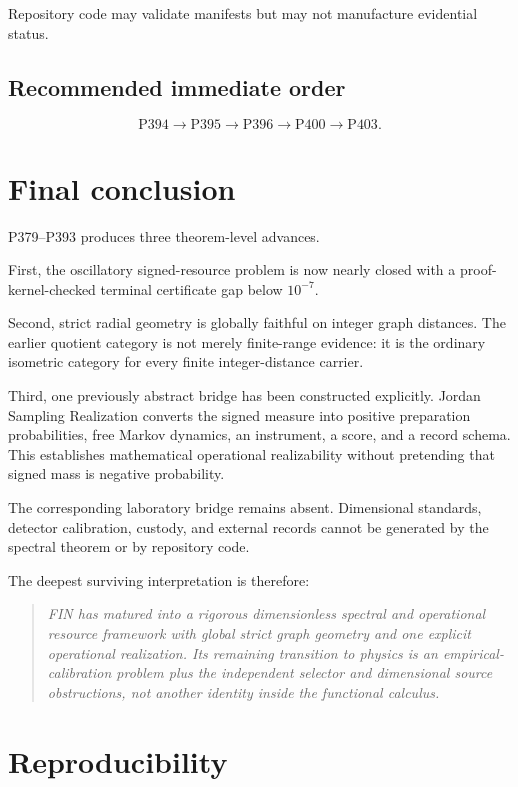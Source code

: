\documentclass[11pt,a4paper,openany]{report}
\begin{document}
Repository code may validate manifests but may not manufacture evidential status.

\section{Recommended immediate order}

\[
\boxed{
\mathrm{P394}
\longrightarrow
\mathrm{P395}
\longrightarrow
\mathrm{P396}
\longrightarrow
\mathrm{P400}
\longrightarrow
\mathrm{P403}
}.
\]

\chapter{Final conclusion}

P379--P393 produces three theorem-level advances.

First, the oscillatory signed-resource problem is now nearly closed with a proof-kernel-checked terminal certificate gap below \(10^{-7}\).

Second, strict radial geometry is globally faithful on integer graph distances. The earlier quotient category is not merely finite-range evidence: it is the ordinary isometric category for every finite integer-distance carrier.

Third, one previously abstract bridge has been constructed explicitly. Jordan Sampling Realization converts the signed measure into positive preparation probabilities, free Markov dynamics, an instrument, a score, and a record schema. This establishes mathematical operational realizability without pretending that signed mass is negative probability.

The corresponding laboratory bridge remains absent. Dimensional standards, detector calibration, custody, and external records cannot be generated by the spectral theorem or by repository code.

The deepest surviving interpretation is therefore:

\begin{quote}\itshape
FIN has matured into a rigorous dimensionless spectral and operational resource framework with global strict graph geometry and one explicit operational realization. Its remaining transition to physics is an empirical-calibration problem plus the independent selector and dimensional source obstructions, not another identity inside the functional calculus.

\end{quote}

\chapter{Reproducibility}
\end{document}
